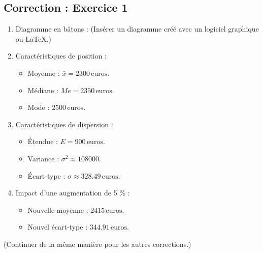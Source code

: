 \documentclass[a4paper,12pt]{article}
\begin{document}
\subsection*{Correction : Exercice 1}
\begin{enumerate}
    \item Diagramme en bâtons : (Insérer un diagramme créé avec un logiciel graphique ou LaTeX.)
    \item Caractéristiques de position :
    \begin{itemize}
        \item Moyenne : $\bar{x} = 2300 \, \text{euros}$.
        \item Médiane : $Me = 2350 \, \text{euros}$.
        \item Mode : $2500 \, \text{euros}$.
    \end{itemize}
    \item Caractéristiques de dispersion :
    \begin{itemize}
        \item Étendue : $E = 900 \, \text{euros}$.
        \item Variance : $\sigma^2 \approx 108000$.
        \item Écart-type : $\sigma \approx 328.49 \, \text{euros}$.
    \end{itemize}
    \item Impact d’une augmentation de 5 \% :
    \begin{itemize}
        \item Nouvelle moyenne : $2415 \, \text{euros}$.
        \item Nouvel écart-type : $344.91 \, \text{euros}$.
    \end{itemize}
\end{enumerate}

(Continuer de la même manière pour les autres corrections.)
\end{document}
